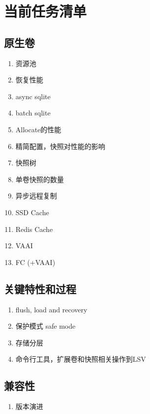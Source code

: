 \chapter{当前任务清单}

\section{原生卷}

\begin{tcolorbox}
\begin{enumerate}
    \item 资源池
    \item 恢复性能
    \item async sqlite
    \item batch sqlite
    \item Allocate的性能
    \item 精简配置，快照对性能的影响
    \item 快照树
    \item 单卷快照的数量
    \item 异步远程复制
    \item SSD Cache
    \item Redis Cache
    \item VAAI
    \item FC (+VAAI)
\end{enumerate}
\end{tcolorbox}

\section{关键特性和过程}

\begin{enumerate}
    \item flush, load and recovery
    \item 保护模式 safe mode
    \item 存储分层
    \item 命令行工具，扩展卷和快照相关操作到LSV
\end{enumerate}

\section{兼容性}

\begin{enumerate}
    \item 版本演进
\end{enumerate}

